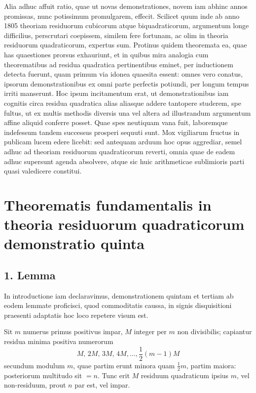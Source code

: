 \documentclass[12pt]{article}
\begin{document}
Alia adhuc affuit ratio, quae ut novas demonstrationes, novem iam abhinc annos promissas, nunc potissimum promulgarem, effecit. Scilicet quum inde ab anno 1805 theoriam residuorum cubicorum atque biquadraticorum, argumentum longe difficilius, perscrutari coepissem, similem fere fortunam, ac olim in theoria residuorum quadraticorum, expertus sum. Protinus quidem theoremata ea, quae has quaestiones prorsus exhauriunt, et in quibus mira analogia cum theorematibus ad residua quadratica pertinentibus eminet, per inductionem detecta fuerunt, quam primum via idonea quaesita essent: omnes vero conatus, ipsorum demonstrationibus ex omni parte perfectis potiundi, per longum tempus irriti manserunt. Hoc ipsum incitamentum erat, ut demonstrationibus iam cognitis circa residua quadratica alias aliasque addere tantopere studerem, spe fultus, ut ex multis methodis diversis una vel altera ad illustrandum argumentum affine aliquid conferre posset. Quae spes neutiquam vana fuit, laboremque indefessum tandem successus prosperi sequuti sunt. Mox vigiliarum fructus in publicam lucem edere licebit: sed antequam arduum hoc opus aggrediar, semel adhuc ad theoriam residuorum quadraticorum reverti, omnia quae de eadem adhuc supersunt agenda absolvere, atque sic huic arithmeticae sublimioris parti quasi valedicere constitui.

\section*{Theorematis fundamentalis in theoria residuorum quadraticorum demonstratio quinta}

\subsection*{1. Lemma}

In introductione iam declaravimus, demonstrationem quintam et tertiam ab eodem lemmate proficisci, quod commoditatis caussa, in signis disquisitioni praesenti adaptatis hoc loco repetere visum est.

Sit $m$ numerus primus positivus impar, $M$ integer per $m$ non divisibilis; capiantur residua minima positiva numerorum
\[
M,\,2M,\,3M,\,4M,\ldots,\frac12(m-1)M
\]
secundum modulum $m$, quae partim erunt minora quam $\frac12m$, partim maiora: posteriorum multitudo sit $=n$. Tunc erit $M$ residuum quadraticum ipsius $m$, vel non-residuum, prout $n$ par est, vel impar.
\end{document}
